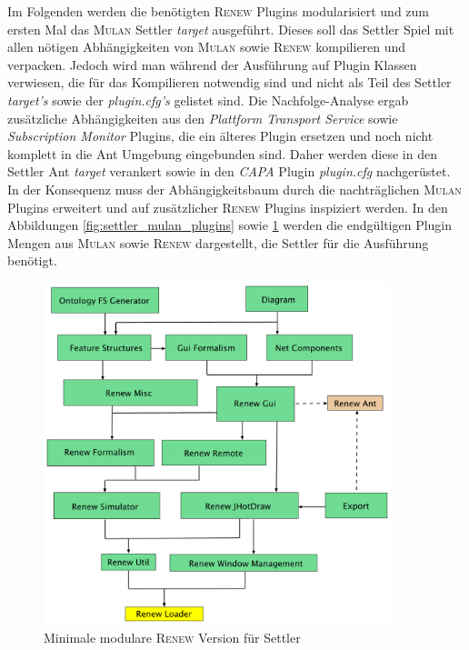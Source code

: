 	Im Folgenden werden die benötigten \textsc{Renew} Plugins modularisiert und zum ersten Mal das \textsc{Mulan} Settler \textit{target} ausgeführt. Dieses soll das Settler Spiel mit allen nötigen Abhängigkeiten von \textsc{Mulan} sowie \textsc{Renew} kompilieren und verpacken. Jedoch wird man während der Ausführung auf Plugin Klassen verwiesen, die für das Kompilieren notwendig sind und nicht als Teil des Settler \textit{target's} sowie der \textit{plugin.cfg's} gelistet sind. \newline
	Die Nachfolge-Analyse ergab zusätzliche Abhängigkeiten aus den \textit{Plattform Transport Service} sowie \textit{Subscription Monitor} Plugins, die ein älteres Plugin ersetzen und noch nicht komplett in die Ant Umgebung eingebunden sind. Daher werden diese in den Settler Ant \textit{target} verankert sowie in den \textit{CAPA} Plugin \textit{plugin.cfg} nachgerüstet. In der Konsequenz muss der Abhängigkeitsbaum durch die nachträglichen \textsc{Mulan} Plugins erweitert und auf zusätzlicher \textsc{Renew} Plugins inspiziert werden. \newline
	In den Abbildungen \ref{fig:settler_mulan_plugins} sowie \ref{fig:renew_mulan_plugins} werden die endgültigen Plugin Mengen aus \textsc{Mulan} sowie \textsc{Renew} dargestellt, die Settler für die Ausführung benötigt. \bigbreak

	\begin{figure}[h!]
	  \centering
	  \includegraphics[width=0.9\textwidth]{material/images/settler-renew-tree-extend.pdf}
	  \caption{Minimale modulare \textsc{Renew} Version für Settler}
	  \label{fig:renew_mulan_plugins}
	\end{figure}	

